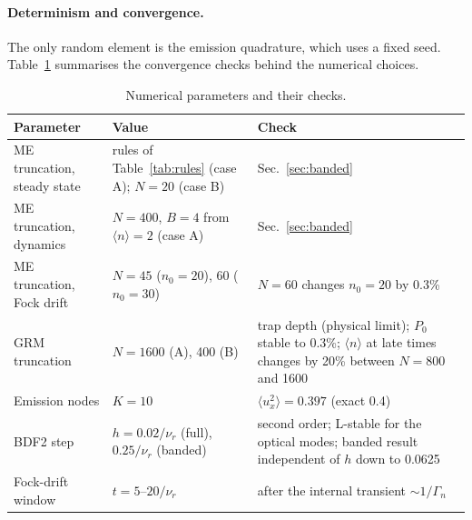 \documentclass[11pt,a4paper]{article}
\begin{document}
\paragraph{Determinism and convergence.} The only random element is the emission quadrature, which uses a fixed seed. Table~\ref{tab:conv} summarises the convergence checks behind the numerical choices.

\begin{table}[h]
\centering\small
\caption{Numerical parameters and their checks.}
\label{tab:conv}
\begin{tabularx}{\textwidth}{@{}lXX@{}}
\toprule
Parameter & Value & Check\\
\midrule
ME truncation, steady state & rules of Table~\ref{tab:rules} (case A); $N=20$ (case B) & Sec.~\ref{sec:banded}\\
ME truncation, dynamics & $N=400$, $B=4$ from $\langle n\rangle=2$ (case A) & Sec.~\ref{sec:banded}\\
ME truncation, Fock drift & $N=45$ ($n_0=20$), 60 ($n_0=30$) & $N=60$ changes $n_0=20$ by 0.3\%\\
GRM truncation & $N=1600$ (A), 400 (B) & trap depth (physical limit); $P_0$ stable to 0.3\%; $\langle n\rangle$ at late times changes by 20\% between $N=800$ and 1600\\
Emission nodes & $K=10$ & $\langle u_x^2\rangle=0.397$ (exact 0.4)\\
BDF2 step & $h=0.02/\nu_r$ (full), $0.25/\nu_r$ (banded) & second order; L-stable for the optical modes; banded result independent of $h$ down to 0.0625\\
Fock-drift window & $t=5$--$20/\nu_r$ & after the internal transient $\sim1/\Gamma_n$\\
\bottomrule
\end{tabularx}
\end{table}

\end{document}
